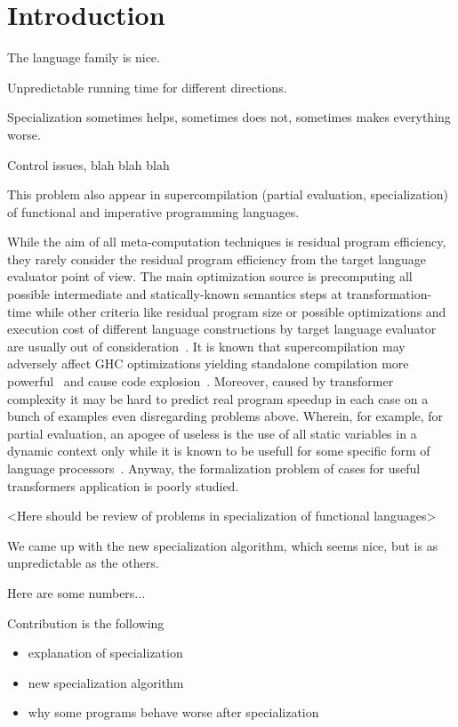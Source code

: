 \section{Introduction}

The \mk{} language family is nice.

Unpredictable running time for different directions.

Specialization sometimes helps, sometimes does not, sometimes makes everything worse.

Control issues, blah blah blah

This problem also appear in supercompilation (partial evaluation, specialization) of functional and imperative programming languages.

While the aim of all meta-computation techniques is residual program efficiency, they rarely consider the residual program efficiency from the target language evaluator point of view.
The main optimization source is precomputing all possible intermediate and statically-known semantics steps at transformation-time while other criteria like residual program size or possible optimizations and execution cost of different language constructions by target language evaluator are usually out of consideration~\cite{jonesbook}.
It is known that supercompilation may adversely affect GHC optimizations yielding standalone compilation more powerful~\cite{SCBE,TCES} and cause code explosion~\cite{SCHC}.
Moreover, caused by transformer complexity it may be hard to predict real program speedup in each case on a bunch of examples even disregarding problems above.
Wherein, for example, for partial evaluation, an apogee of useless is the use of all static variables in a dynamic context only while it is known to be usefull for some specific form of language processors~\cite{jonesbook,bulyonkov84}.
Anyway, the formalization problem of cases for useful transformers application is poorly studied.

<Here should be review of problems in specialization of functional languages>


We came up with the new specialization algorithm, which seems nice, but is as unpredictable as the others.

Here are some numbers...

Contribution is the following
\begin{itemize}
  \item explanation of specialization
  \item new specialization algorithm
  \item why some programs behave worse after specialization
\end{itemize}
